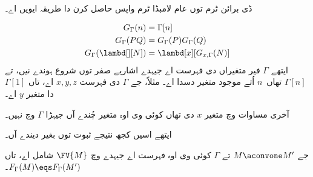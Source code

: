 \documentclass[../../../include/open-logic-section]{subfiles}
\begin{document}
ڈی برائن ٹرم توں عام لامبڈا ٹرم واپس حاصل کرن دا طریقہ ایویں اے۔

\begin{defn}
  \begin{align*}
    G_\Gamma(n) &= \Gamma[n] \\
    G_\Gamma(PQ) &= G_\Gamma(P) G_\Gamma(Q) \\
    G_\Gamma(\lambd[][N]) &= \lambd[x][G_{x,\Gamma}(N)]
  \end{align*}
  ایتھے $\Gamma$ فیر متغیراں دی فہرست اے جیہدے اشاریے صفر توں
  شروع ہوندے نیں، تے $\Gamma[n]$ تھاں~$n$ اُتے موجود متغیر دسدا اے۔
  مثلاً، جے $\Gamma$ دی فہرست $x,y,z$ اے، تاں $\Gamma[1]$ دا
  متغیر $y$ اے۔

  آخری مساوات وچ متغیر $x$ دی تھاں کوئی وی اوہ متغیر چُندے
  آں جیہڑا $\Gamma$ وچ نہیں۔
\end{defn}

ایتھے اسیں کجھ نتیجے ثبوت توں بغیر دیندے آں۔

\begin{prop}
  جے $M \aconvone M'$ تے $\Gamma$ کوئی وی اوہ فہرست اے جیہدے
  وچ $\FV{M}$ شامل اے، تاں $F_\Gamma(M) \eqs F_\Gamma(M')$۔
\end{prop}
\end{document}
